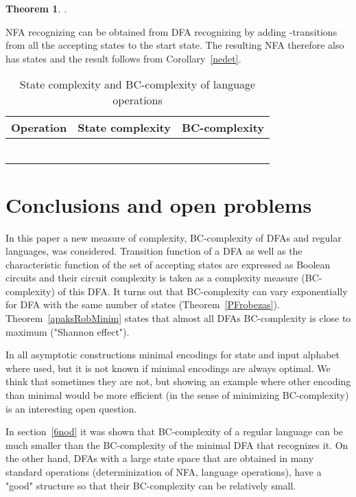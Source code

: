 \documentclass[copyright, creativecommons]{eptcs}
\newcommand{\qed}{}
\newtheorem{theorem}{Theorem}[section]
\newenvironment{proof}[1][Proof]{\begin{trivlist}
\item[\hskip \labelsep {\bfseries #1}]}{\end{trivlist}}
\begin{document}
\begin{theorem}
.
\end{theorem}
\begin{proof}
NFA recognizing  can be obtained from DFA recognizing  by adding -transitions from
all the accepting states to the start state. The resulting NFA therefore also has  states and the result
follows from Corollary~\ref{nedet}.
\qed
\end{proof}

\begin{table}[htb]
\centering
\begin{tabular}{|c|c|c|}\hline
Operation & State complexity & BC-complexity\\\hline
 &  & \\\hline
 &  & \\\hline
 &  & \\\hline
 &  & \\\hline
 &  & \\\hline
 &  & \\\hline
\end{tabular}
\caption{State complexity and BC-complexity of language operations}
\label{valoduOperacijas}
\end{table}



\section{Conclusions and open problems}
\label{7nod}
In this paper a new measure of complexity, BC-complexity of DFAs and regular languages, was considered.
Transition function of a DFA as well as the characteristic function of the set of accepting states are expressed
as Boolean circuits and their circuit complexity is taken as a complexity measure (BC-complexity) of this DFA.
It turns out that BC-complexity can vary exponentially for DFA with the same number of states (Theorem~\ref{PFrobezas}).
Theorem~\ref{apaksRobMinim} states that almost all DFAs
BC-complexity is close to maximum ("Shannon effect"). 

In all asymptotic  constructions minimal encodings for state and input alphabet where used,
but it is not known if minimal encodings are always optimal. We think that sometimes they are not, but showing
an example where other encoding
than minimal would be more
efficient (in the sense of minimizing BC-complexity) is an interesting open question.


In section~\ref{6nod} it was shown that BC-complexity of a regular language can be much smaller
than the BC-complexity of the minimal DFA that recognizes it.
On the other hand, DFAs with a large state space that are obtained in many standard operations
(determinization of NFA, language operations), have a "good" structure so
that their BC-complexity can be relatively small.



\nocite{*}


\end{document}
